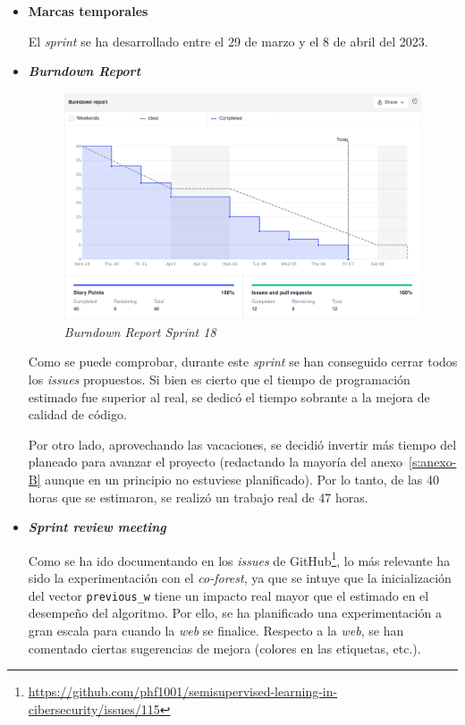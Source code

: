 \begin{itemize}
\begin{enumerate}
	\end{enumerate}
	\item \textbf{Marcas temporales}		
	
	El \textit{sprint} se ha desarrollado entre el 29 de marzo y el 8 de abril del 2023.
	
	\item \textbf{\textit{Burndown Report}}
	
		\begin{figure}[h]
		\caption{\textit{Burndown Report Sprint 18}}
		\centering
		\includegraphics[width=\textwidth]{../img/anexos/bdr/s18_bdr}
	\end{figure}

	Como se puede comprobar, durante este \textit{sprint} se han conseguido cerrar todos los \textit{issues} propuestos. Si bien es cierto que el tiempo de programación estimado fue superior al real, se dedicó el tiempo sobrante a la mejora de calidad de código.
	
	Por otro lado, aprovechando las vacaciones, se decidió invertir más tiempo del planeado para avanzar el proyecto (redactando la mayoría del anexo~\ref{s:anexo-B} aunque en un principio no estuviese planificado). Por lo tanto, de las 40 horas que se estimaron, se realizó un trabajo real de 47 horas.


	\item \textbf{\textit{Sprint review meeting}}
	
	Como se ha ido documentando en los \textit{issues} de GitHub\footnote{\url{https://github.com/phf1001/semisupervised-learning-in-cibersecurity/issues/115}}, lo más relevante ha sido la experimentación con el \textit{co-forest}, ya que se intuye que la inicialización del vector \texttt{previous\_w} tiene un impacto real mayor que el estimado en el desempeño del algoritmo. Por ello, se ha planificado una experimentación a gran escala para cuando la \textit{web} se finalice. Respecto a la \textit{web}, se han comentado ciertas sugerencias de mejora (colores en las etiquetas, etc.).
	
\end{itemize}


